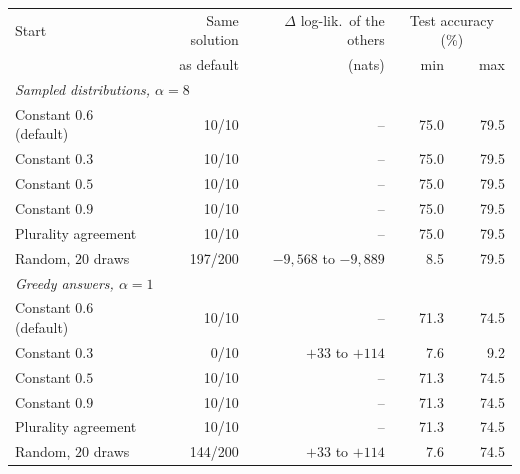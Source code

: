 \begin{tabular}{lrrrr}
\toprule
Start & Same solution & $\Delta$ log-lik.\ of the others & \multicolumn{2}{c}{Test accuracy (\%)} \\
 & as default & (nats) & min & max \\
\midrule
\multicolumn{5}{l}{\emph{Sampled distributions, $\alpha = 8$}} \\
Constant $0.6$ (default) & 10/10 & -- & 75.0 & 79.5 \\
Constant $0.3$ & 10/10 & -- & 75.0 & 79.5 \\
Constant $0.5$ & 10/10 & -- & 75.0 & 79.5 \\
Constant $0.9$ & 10/10 & -- & 75.0 & 79.5 \\
Plurality agreement & 10/10 & -- & 75.0 & 79.5 \\
Random, $20$ draws & 197/200 & $-9{,}568$ to $-9{,}889$ & 8.5 & 79.5 \\
\midrule
\multicolumn{5}{l}{\emph{Greedy answers, $\alpha = 1$}} \\
Constant $0.6$ (default) & 10/10 & -- & 71.3 & 74.5 \\
Constant $0.3$ & 0/10 & $+33$ to $+114$ & 7.6 & 9.2 \\
Constant $0.5$ & 10/10 & -- & 71.3 & 74.5 \\
Constant $0.9$ & 10/10 & -- & 71.3 & 74.5 \\
Plurality agreement & 10/10 & -- & 71.3 & 74.5 \\
Random, $20$ draws & 144/200 & $+33$ to $+114$ & 7.6 & 74.5 \\
\bottomrule
\end{tabular}
